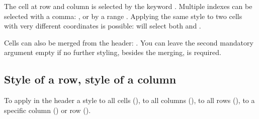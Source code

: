 The cell at row  and column  is selected by the keyword . Multiple indexes can be selected with a comma: , or by a range . Applying the same style to two cells with very different coordinates is possible:  will select both  and .

Cells can also be merged from the header: . You can leave the second mandatory argument empty \snippet{\{\}} if no further styling, besides the merging, is required.

\subsection{Style of a row, style of a column}

To apply in the header a style to all cells (), to all columns (), to all rows (), to a specific column () or row ().


